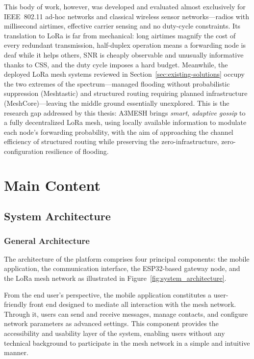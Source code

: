 \documentclass[english,bachelor]{tfgitic}[2026/01/22]
\begin{document}
This body of work, however, was developed and evaluated almost exclusively for IEEE~802.11 ad-hoc networks and classical wireless sensor networks---radios with millisecond airtimes, effective carrier sensing and no duty-cycle constraints. Its translation to LoRa is far from mechanical: long airtimes magnify the cost of every redundant transmission, half-duplex operation means a forwarding node is deaf while it helps others, SNR is cheaply observable and unusually informative thanks to CSS, and the duty cycle imposes a hard budget. Meanwhile, the deployed LoRa mesh systems reviewed in Section~\ref{sec:existing-solutions} occupy the two extremes of the spectrum---managed flooding without probabilistic suppression (Meshtastic) and structured routing requiring planned infrastructure (MeshCore)---leaving the middle ground essentially unexplored. This is the research gap addressed by this thesis: A3MESH brings \emph{smart, adaptive gossip} to a fully decentralized LoRa mesh, using locally available information to modulate each node's forwarding probability, with the aim of approaching the channel efficiency of structured routing while preserving the zero-infrastructure, zero-configuration resilience of flooding.



\chapter{Main Content}

\section{System Architecture}
\label{ch:sysarch}

\subsection{General Architecture}
\label{sec:general_architecture}

The architecture of the platform comprises four principal components: the mobile application, the  communication interface, the ESP32-based gateway node, and the LoRa mesh network as illustrated in Figure~\ref{fig:system_architecture}.

 
From the end user's perspective, the mobile application constitutes a user-friendly front end designed to mediate all interaction with the mesh network. Through it, users can send and receive messages, manage contacts, and configure network parameters as advanced settings. This component provides the accessibility and usability layer of the system, enabling users without any technical background to participate in the mesh network in a simple and intuitive manner.
 
\end{document}
